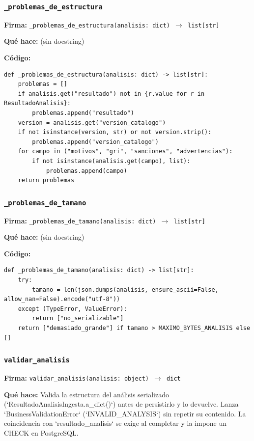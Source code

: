 \documentclass[11pt,a4paper]{article}
\begin{document}
\subsubsection*{\texttt{\_problemas\_de\_estructura}}
\textbf{Firma:} \texttt{\_problemas\_de\_estructura(analisis: dict) $\rightarrow$ list[str]}

\textbf{Qué hace:} (sin docstring)

\textbf{Código:}
\begin{lstlisting}
def _problemas_de_estructura(analisis: dict) -> list[str]:
    problemas = []
    if analisis.get("resultado") not in {r.value for r in ResultadoAnalisis}:
        problemas.append("resultado")
    version = analisis.get("version_catalogo")
    if not isinstance(version, str) or not version.strip():
        problemas.append("version_catalogo")
    for campo in ("motivos", "gri", "sanciones", "advertencias"):
        if not isinstance(analisis.get(campo), list):
            problemas.append(campo)
    return problemas
\end{lstlisting}

\subsubsection*{\texttt{\_problemas\_de\_tamano}}
\textbf{Firma:} \texttt{\_problemas\_de\_tamano(analisis: dict) $\rightarrow$ list[str]}

\textbf{Qué hace:} (sin docstring)

\textbf{Código:}
\begin{lstlisting}
def _problemas_de_tamano(analisis: dict) -> list[str]:
    try:
        tamano = len(json.dumps(analisis, ensure_ascii=False, allow_nan=False).encode("utf-8"))
    except (TypeError, ValueError):
        return ["no_serializable"]
    return ["demasiado_grande"] if tamano > MAXIMO_BYTES_ANALISIS else []
\end{lstlisting}

\subsubsection*{\texttt{validar\_analisis}}
\textbf{Firma:} \texttt{validar\_analisis(analisis: object) $\rightarrow$ dict}

\textbf{Qué hace:} Valida la estructura del análisis serializado (`ResultadoAnalisisIngesta.a\_dict()`) antes de
persistirlo y lo devuelve. Lanza `BusinessValidationError` (`INVALID\_ANALYSIS`) sin repetir su contenido.
La coincidencia con `resultado\_analisis` se exige al completar y la impone un CHECK en PostgreSQL.
\end{document}

